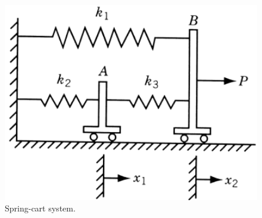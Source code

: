 \documentclass[12pt]{article}
\begin{document}
\begin{figure}[H]
	\begin{center}
		\includegraphics[width=16cm]{springs.png}
		\caption{Spring-cart system.}
	\end{center}
\end{figure}
\end{document}
